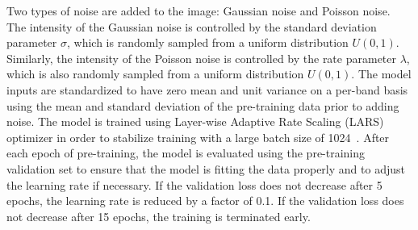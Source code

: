 Two types of noise are added to the image: Gaussian noise and Poisson noise.
The intensity of the Gaussian noise is controlled by the standard deviation parameter \(\sigma\), which is randomly sampled from a uniform distribution \(U(0, 1)\).
Similarly, the intensity of the Poisson noise is controlled by the rate parameter \(\lambda\), which is also randomly sampled from a uniform distribution \(U(0, 1)\). 
The model inputs are standardized to have zero mean and unit variance on a per-band basis using the mean and standard deviation of the pre-training data prior to adding noise.
The model is trained using Layer-wise Adaptive Rate Scaling (LARS) optimizer in order to stabilize training with a large batch size of 1024~\cite{youLargeBatchTraining2017}.
After each epoch of pre-training, the model is evaluated using the pre-training validation set to ensure that the model is fitting the data properly and to adjust the learning rate if necessary.
If the validation loss does not decrease after 5 epochs, the learning rate is reduced by a factor of 0.1.
If the validation loss does not decrease after 15 epochs, the training is terminated early.

